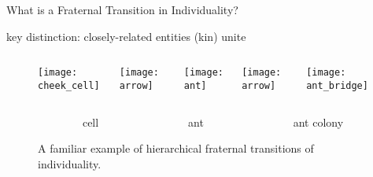 \begin{frame}{What is a Fraternal Transition in Individuality?}

key distinction: closely-related entities (kin) unite

\pause

\vspace{6ex}

\begin{figure}
\begin{columns}
\begin{column}{0.27\textwidth}
\texttt{[image: cheek\_cell]}
\end{column}
\begin{column}{0.07\textwidth}
\texttt{[image: arrow]}
\end{column}
\begin{column}{0.27\textwidth}
\texttt{[image: ant]}
\end{column}
\begin{column}{0.07\textwidth}
\texttt{[image: arrow]}
\end{column}
\begin{column}{0.27\textwidth}
\texttt{[image: ant\_bridge]}
\end{column}
\end{columns}
\vspace{1ex}
\begin{columns}
\begin{column}{0.05\textwidth}
\end{column}
\begin{column}{0.27\textwidth}
\centering
cell {\tiny\cite{clare_and_ben_2017}}
\end{column}
\begin{column}{0.07\textwidth}
\end{column}
\begin{column}{0.27\textwidth}
\centering
ant {\tiny\cite{quinzani_2008}}
\end{column}
\begin{column}{0.07\textwidth}
\end{column}
\begin{column}{0.27\textwidth}
\centering
ant colony {\tiny\cite{gallice_2011}}
\end{column}
\end{columns}
\vspace{2ex}
\caption{
A familiar example of hierarchical fraternal transitions of individuality.
}

\end{figure}


\end{frame}

